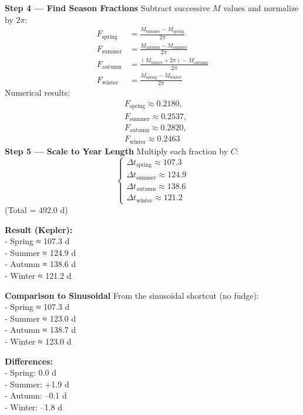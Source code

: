 \documentclass[
  letterpaper,
]{book}
\begin{document}
\textbf{Step 4 --- Find Season Fractions} Subtract successive \(M\)
values and normalize by \(2\pi\):\\
\[
\begin{aligned}
F_\text{spring} &= \frac{M_\text{summer} - M_\text{spring}}{2\pi} \\[6pt]
F_\text{summer} &= \frac{M_\text{autumn} - M_\text{summer}}{2\pi} \\[6pt]
F_\text{autumn} &= \frac{(M_\text{winter}+2\pi) - M_\text{autumn}}{2\pi} \\[6pt]
F_\text{winter} &= \frac{M_\text{spring} - M_\text{winter}}{2\pi} 
\end{aligned}
\] Numerical results:\\
\[
\begin{align}
&F_\text{spring} \approx 0.2180, \\
&F_\text{summer} \approx 0.2537, \\
&F_\text{autumn} \approx 0.2820, \\
&F_\text{winter} \approx 0.2463
\end{align}
\] \textbf{Step 5 --- Scale to Year Length} Multiply each fraction by
\(C\):\\
\[
\begin{cases}
\Delta t_\text{spring} \approx 107.3 \\
\Delta t_\text{summer} \approx 124.9 \\
\Delta t_\text{autumn} \approx 138.6 \\
\Delta t_\text{winter} \approx 121.2
\end{cases}
\] (Total = 492.0 d)

\textbf{Result (Kepler):}\\
- Spring ≈ 107.3 d\\
- Summer ≈ 124.9 d\\
- Autumn ≈ 138.6 d\\
- Winter ≈ 121.2 d

\textbf{Comparison to Sinusoidal} From the sinusoidal shortcut (no
fudge):\\
- Spring ≈ 107.3 d\\
- Summer ≈ 123.0 d\\
- Autumn ≈ 138.7 d\\
- Winter ≈ 123.0 d

\textbf{Differences:}\\
- Spring: 0.0 d\\
- Summer: +1.9 d\\
- Autumn: --0.1 d\\
- Winter: --1.8 d
\end{document}
